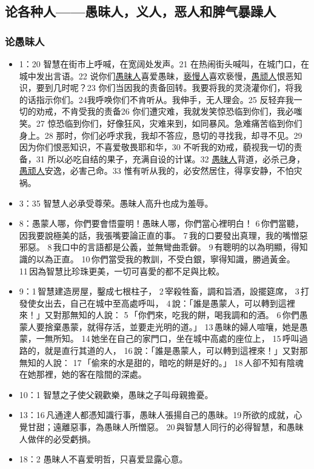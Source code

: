 \subsection{论各种人——愚昧人，义人，恶人和脾气暴躁人}
\subsubsection{论愚昧人}
\begin{itemize}
\itemsep-.45em 
\item 1：20 智慧在街市上呼喊，在宽阔处发声。21 在热闹街头喊叫，在城门口，在城中发出言语。22 说你们\underline{愚昧人}喜爱愚昧，\underline{亵慢人}喜欢亵慢，\underline{愚顽人}恨恶知识，要到几时呢？23 你们当因我的责备回转。我要将我的灵浇灌你们，将我的话指示你们。24我呼唤你们不肯听从。我伸手，无人理会。25 反轻弃我一切的劝戒，不肯受我的责备26 你们遭灾难，我就发笑惊恐临到你们，我必嗤笑。27 惊恐临到你们，好像狂风，灾难来到，如同暴风。急难痛苦临到你们身上。28 那时，你们必呼求我，我却不答应，恳切的寻找我，却寻不见。29 因为你们恨恶知识，不喜爱敬畏耶和华，30 不听我的劝戒，藐视我一切的责备，31 所以必吃自结的果子，充满自设的计谋。32 \underline{愚昧人}背道，必杀己身，\underline{愚顽人}安逸，必害己命。33 惟有听从我的，必安然居住，得享安静，不怕灾祸。
\item 3：35 智慧人必承受尊荣。愚昧人高升也成为羞辱。
\item 8：愚蒙人哪，你們要會悟靈明！愚昧人哪，你們當心裡明白！ 6 你們當聽，因我要說極美的話，我張嘴要論正直的事。 7 我的口要發出真理，我的嘴憎惡邪惡。 8 我口中的言語都是公義，並無彎曲乖僻。 9 有聰明的以為明顯，得知識的以為正直。 10 你們當受我的教訓，不受白銀，寧得知識，勝過黃金。 11 因為智慧比珍珠更美，一切可喜愛的都不足與比較。
\item 9：1 智慧建造房屋，鑿成七根柱子， 2 宰殺牲畜，調和旨酒，設擺筵席， 3 打發使女出去，自己在城中至高處呼叫， 4 說：「誰是愚蒙人，可以轉到這裡來！」又對那無知的人說： 5 「你們來，吃我的餅，喝我調和的酒。 6 你們愚蒙人要捨棄愚蒙，就得存活，並要走光明的道。」 13 愚昧的婦人喧嚷，她是愚蒙，一無所知。 14 她坐在自己的家門口，坐在城中高處的座位上， 15 呼叫過路的，就是直行其道的人， 16 說：「誰是愚蒙人，可以轉到這裡來！」又對那無知的人說： 17 「偷來的水是甜的，暗吃的餅是好的。」 18 人卻不知有陰魂在她那裡，她的客在陰間的深處。
\item 10：1 智慧之子使父親歡樂，愚昧之子叫母親擔憂。
\item 13：16 凡通達人都憑知識行事，愚昧人張揚自己的愚昧。19 所欲的成就，心覺甘甜；遠離惡事，為愚昧人所憎惡。 20 與智慧人同行的必得智慧，和愚昧人做伴的必受虧損。
\item 18：2 愚昧人不喜爱明哲，只喜爱显露心意。

\end{itemize}

